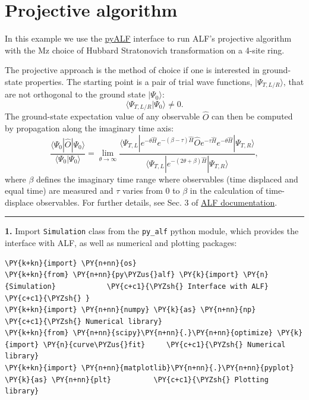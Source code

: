     
    

    
    \hypertarget{projective-algorithm}{%
\section{Projective algorithm}\label{projective-algorithm}}

    In this example we use the
\href{https://git.physik.uni-wuerzburg.de/ALF/pyALF/-/tree/ALF-2.0}{pyALF}
interface to run ALF's projective algorithm with the Mz choice of
Hubbard Stratonovich transformation on a 4-site ring.

The projective approach is the method of choice if one is interested in
ground-state properties. The starting point is a pair of trial wave
functions, \(|\Psi_{T,L/R} \rangle\), that are not orthogonal to the
ground state \(|\Psi_0 \rangle\): \[
  \langle \Psi_{T,L/R}  | \Psi_0 \rangle  \neq 0. 
\] The ground-state expectation value of any observable \(\hat{O}\) can
then be computed by propagation along the imaginary time axis: \[
     \frac{ \langle \Psi_0 | \hat{O} | \Psi_0 \rangle }{ \langle \Psi_0 | \Psi_0 \rangle}   = \lim_{\theta \rightarrow \infty}  
     \frac{ \langle \Psi_{T,L} | e^{-\theta \hat{H}}  e^{-(\beta - \tau)\hat{H}  }\hat{O} e^{- \tau  \hat{H} }   e^{-\theta \hat{H}} | \Psi_{T,R} \rangle } 
            { \langle \Psi_{T,L} | e^{-(2 \theta + \beta) \hat{H}  } | \Psi_{T,R} \rangle } ,
\] where \(\beta\) defines the imaginary time range where observables
(time displaced and equal time) are measured and \(\tau\) varies from
\(0\) to \(\beta\) in the calculation of time-displace observables. For
further details, see Sec. 3 of
\href{https://git.physik.uni-wuerzburg.de/ALF/ALF/-/blob/5a887441c8dca138ef2c9b643948d4eccee808ae/Documentation/doc.pdf}{ALF
documentation}.

\begin{center}\rule{0.5\linewidth}{\linethickness}\end{center}

\textbf{1.} Import \texttt{Simulation} class from the \texttt{py\_alf}
python module, which provides the interface with ALF, as well as
numerical and plotting packages:

    \begin{tcolorbox}[breakable, size=fbox, boxrule=1pt, pad at break*=1mm,colback=cellbackground, colframe=cellborder]
\begin{Verbatim}[commandchars=\\\{\}]
\PY{k+kn}{import} \PY{n+nn}{os}
\PY{k+kn}{from} \PY{n+nn}{py\PYZus{}alf} \PY{k}{import} \PY{n}{Simulation}            \PY{c+c1}{\PYZsh{} Interface with ALF}
\PY{c+c1}{\PYZsh{} }
\PY{k+kn}{import} \PY{n+nn}{numpy} \PY{k}{as} \PY{n+nn}{np}                       \PY{c+c1}{\PYZsh{} Numerical library}
\PY{k+kn}{from} \PY{n+nn}{scipy}\PY{n+nn}{.}\PY{n+nn}{optimize} \PY{k}{import} \PY{n}{curve\PYZus{}fit}     \PY{c+c1}{\PYZsh{} Numerical library}
\PY{k+kn}{import} \PY{n+nn}{matplotlib}\PY{n+nn}{.}\PY{n+nn}{pyplot} \PY{k}{as} \PY{n+nn}{plt}          \PY{c+c1}{\PYZsh{} Plotting library}
\end{Verbatim}
\end{tcolorbox}

